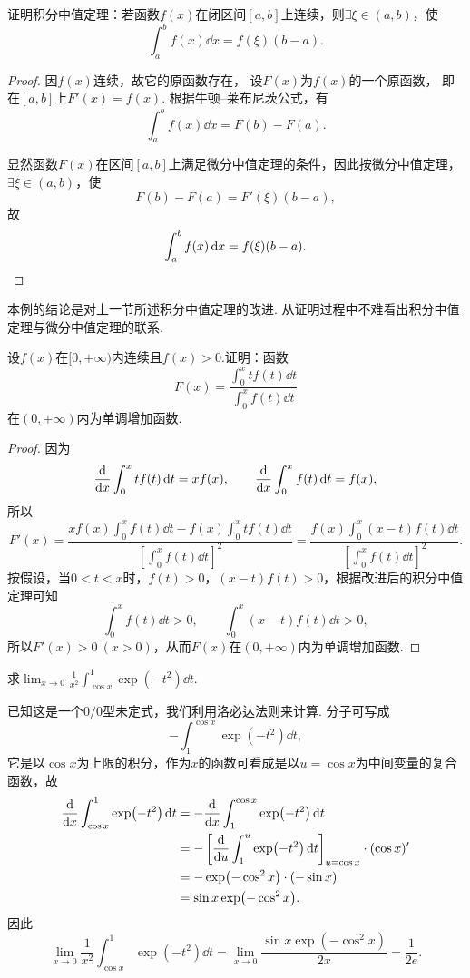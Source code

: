 \begin{example}
证明积分中值定理：若函数\(f(x)\)在闭区间\([a,b]\)上连续，则\(\exists\xi\in(a,b)\)，使\[
\int_a^b f(x) \dd{x} = f(\xi) (b-a).
\]
\begin{proof}
因\(f(x)\)连续，故它的原函数存在，
设\(F(x)\)为\(f(x)\)的一个原函数，
即在\([a,b]\)上\(F'(x) = f(x)\).
根据牛顿--莱布尼茨公式，有\[
	\int_a^b f(x) \dd{x}
	= F(b) - F(a).
\]

显然函数\(F(x)\)在区间\([a,b]\)上满足微分中值定理的条件，因此按微分中值定理，\(\exists\xi\in(a,b)\)，使\[
F(b) - F(a) = F'(\xi) (b-a),
\]故\[
\int_a^b f(x) \dd{x} = f(\xi) (b-a).
\qedhere
\]
\end{proof}
\end{example}
本例的结论是对上一节所述积分中值定理的改进.
从证明过程中不难看出积分中值定理与微分中值定理的联系.

\begin{example}
\def\fu{\displaystyle \int_0^x t f(t) \dd{t}}
\def\fv{\displaystyle \int_0^x f(t) \dd{t}}
\def\fvv{\left[ \fv \right]^2}
\def\fw{\displaystyle \int_0^x (x-t) f(t) \dd{t}}
设\(f(x)\)在\([0,+\infty)\)内连续且\(f(x) > 0\).证明：函数\[
F(x) = \frac{\fu}{\fv}
\]在\((0,+\infty)\)内为单调增加函数.
\begin{proof}
因为\[
\dv{x} \fu = x f(x),
\qquad
\dv{x} \fv = f(x),
\]所以\[
F'(x) = \frac{x f(x) \fv - f(x) \fu}{\fvv}
= \frac{f(x) \fw}{\fvv}.
\]按假设，当\(0 < t < x\)时，\(f(t) > 0\)，\((x-t) f(t) > 0\)，根据改进后的积分中值定理可知\[
\fv > 0, \qquad \fw > 0,
\]所以\(F'(x) > 0\ (x > 0)\)，从而\(F(x)\)在\((0,+\infty)\)内为单调增加函数.
\end{proof}
\end{example}

\begin{example}
求\(\lim_{x\to0} \frac{1}{x^2} \int_{\cos x}^1 \exp(-t^2) \dd{t}\).
\begin{solution}
已知这是一个\(0/0\)型未定式，我们利用洛必达法则来计算.
分子可写成\[
- \int_1^{\cos x} \exp(-t^2) \dd{t},
\]它是以\(\cos x\)为上限的积分，作为\(x\)的函数可看成是以\(u = \cos x\)为中间变量的复合函数，故\begin{align*}
\dv{x} \int_{\cos x}^1 \exp(-t^2) \dd{t}
&= -\dv{x} \int_1^{\cos x} \exp(-t^2) \dd{t} \\
&= -\left[ \dv{u}\int_1^u \exp(-t^2) \dd{t} \right]_{u=\cos x} \cdot (\cos x)' \\
&= -\exp(-\cos^2 x) \cdot (-\sin x) \\
&= \sin x \exp(-\cos^2 x).
\end{align*}
因此\[
\lim_{x\to0} \frac{1}{x^2} \int_{\cos x}^1 \exp(-t^2) \dd{t}
= \lim_{x\to0} \frac{\sin x \exp(-\cos^2 x)}{2x}
= \frac{1}{2e}.
\]
\end{solution}
\end{example}

